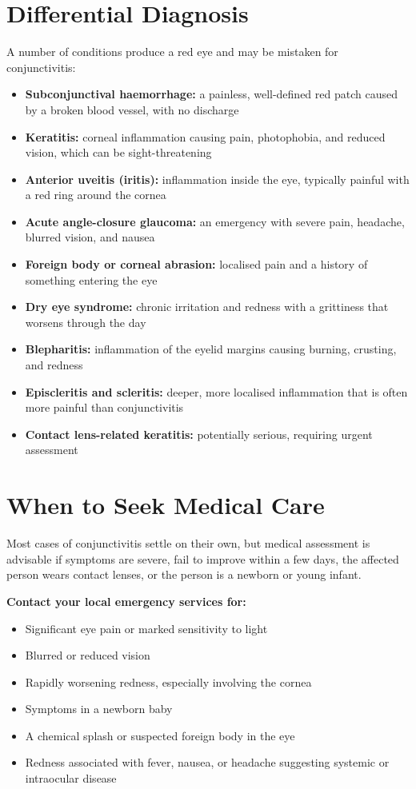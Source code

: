 \section*{Differential Diagnosis}
\medskip
\noindent A number of conditions produce a red eye and may be mistaken for conjunctivitis:
\begin{itemize}
    \item \textbf{Subconjunctival haemorrhage:} a painless, well-defined red patch caused by a broken blood vessel, with no discharge
    \item \textbf{Keratitis:} corneal inflammation causing pain, photophobia, and reduced vision, which can be sight-threatening
    \item \textbf{Anterior uveitis (iritis):} inflammation inside the eye, typically painful with a red ring around the cornea
    \item \textbf{Acute angle-closure glaucoma:} an emergency with severe pain, headache, blurred vision, and nausea
    \item \textbf{Foreign body or corneal abrasion:} localised pain and a history of something entering the eye
    \item \textbf{Dry eye syndrome:} chronic irritation and redness with a grittiness that worsens through the day
    \item \textbf{Blepharitis:} inflammation of the eyelid margins causing burning, crusting, and redness
    \item \textbf{Episcleritis and scleritis:} deeper, more localised inflammation that is often more painful than conjunctivitis
    \item \textbf{Contact lens-related keratitis:} potentially serious, requiring urgent assessment
\end{itemize}

\section*{When to Seek Medical Care}
Most cases of conjunctivitis settle on their own, but medical assessment is advisable if symptoms are severe, fail to improve within a few days, the affected person wears contact lenses, or the person is a newborn or young infant.

\textbf{Contact your local emergency services for:}
\begin{itemize}
    \item Significant eye pain or marked sensitivity to light
    \item Blurred or reduced vision
    \item Rapidly worsening redness, especially involving the cornea
    \item Symptoms in a newborn baby
    \item A chemical splash or suspected foreign body in the eye
    \item Redness associated with fever, nausea, or headache suggesting systemic or intraocular disease
\end{itemize}

